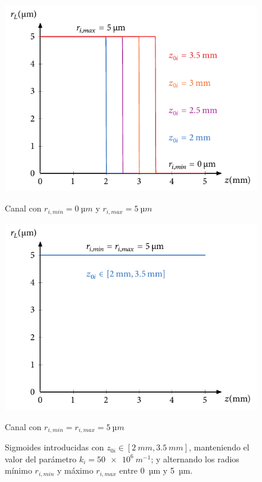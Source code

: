 \begin{figure}[htbp]
  \centering
  \begin{subcaptionblock}{.4\textwidth}
    \centering
    \includegraphics[width=\textwidth]{Figuras/ch4_sigm1_z0.pdf}
    \caption{Canal con $r_{i,min}=\qty{0}{µm}$ y $r_{i,max}=\qty{5}{µm}$}\label{fig:ch4_sigm1_z0}
  \end{subcaptionblock}
  \begin{subcaptionblock}{.4\textwidth}
    \centering
    \includegraphics[width=\textwidth]{Figuras/ch4_sigm2_z0.pdf}
    \caption{Canal con $r_{i,min}=r_{i,max}=\qty{5}{µm}$}\label{fig:ch4_sigm2_z0}
  \end{subcaptionblock}
   \caption{Sigmoides introducidas con $z_{0i}\in[\qty{2}{mm},\qty{3.5}{mm}]$, manteniendo el valor del parámetro $k_{i}=\qty{50e6}{m^{-1}}$; y alternando los radios mínimo $r_{i,min}$ y máximo $r_{i,max}$ entre \qty{0}{µm} y \qty{5}{µm}.}
   \label{fig:4.10}
\end{figure}

